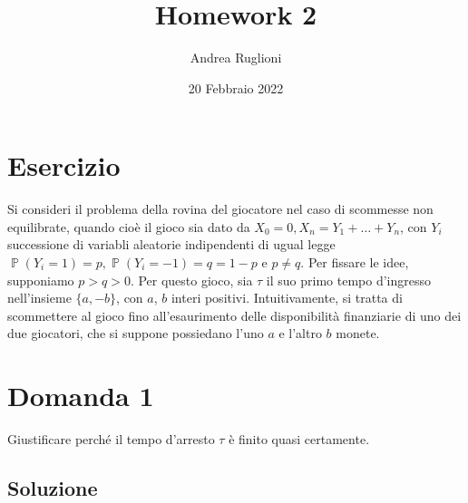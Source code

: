 \documentclass[
	12pt, %
]{fphw}
\title{Homework 2} %
\author{Andrea Ruglioni} %
\date{20 Febbraio 2022} %
\institute{Politecnico di Torino} %
\DeclareMathOperator{\Pro}{\mathbb{P}}%
\begin{document}
\maketitle %



\section*{Esercizio}
\begin{problem}
	Si consideri il problema della rovina del giocatore nel caso di scommesse non equilibrate,
	quando cioè il gioco sia dato da $X_0 = 0, X_n = Y_1 + \dots + Y_n$, con $Y_i$ successione di variabli
	aleatorie indipendenti di ugual legge $\Pro(Y_i = 1) = p, \Pro(Y_i = -1) = q = 1 - p$ e $p \neq q$. Per
	fissare le idee, supponiamo $p > q > 0$. Per questo gioco, sia $\tau$ il suo primo tempo d'ingresso
	nell'insieme $\{a, -b\}$, con $a$, $b$ interi positivi. Intuitivamente, si tratta di scommettere al gioco
	fino all'esaurimento delle disponibilità finanziarie di uno dei due giocatori, che si suppone
	possiedano l'uno $a$ e l'altro $b$ monete.

	\smallskip
\end{problem}

\section*{Domanda 1}
\begin{problem}
	Giustificare perché il tempo d'arresto $\tau$ è finito quasi certamente.
	\smallskip
\end{problem}

\subsection*{Soluzione}
\end{document}
